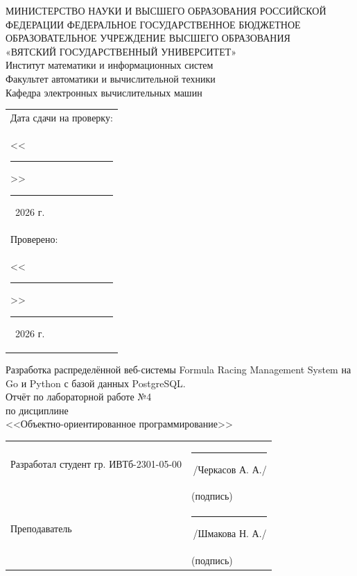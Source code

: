 \documentclass[oneside,a4paper,14pt]{extarticle}
\begin{document}
\newpage
\thispagestyle{empty}
\begin{center}
  МИНИСТЕРСТВО НАУКИ И ВЫСШЕГО ОБРАЗОВАНИЯ РОССИЙСКОЙ ФЕДЕРАЦИИ ФЕДЕРАЛЬНОЕ ГОСУДАРСТВЕННОЕ БЮДЖЕТНОЕ ОБРАЗОВАТЕЛЬНОЕ УЧРЕЖДЕНИЕ ВЫСШЕГО ОБРАЗОВАНИЯ\\
  «ВЯТСКИЙ ГОСУДАРСТВЕННЫЙ УНИВЕРСИТЕТ»\\
  Институт математики и информационных систем\\
  Факультет автоматики и вычислительной техники\\
  Кафедра электронных вычислительных машин
\end{center}
\vspace{10mm}

\hfill
\begin{tabular}{l}
  \footnotesize Дата сдачи на проверку:                                          \\
  \footnotesize <<\rule[-1mm]{5mm}{0.10mm}\/>>\ \rule[-1mm]{20mm}{0.10mm}\ 2026 г. \\
  \footnotesize Проверено:                                                       \\
  \footnotesize <<\rule[-1mm]{5mm}{0.10mm}\/>>\ \rule[-1mm]{20mm}{0.10mm}\ 2026 г. \\
\end{tabular}
\vfill

\begin{center}
  Разработка распределённой веб-системы Formula Racing Management System на Go и Python с базой данных PostgreSQL. \\
  Отчёт по лабораторной работе №4\\
  по дисциплине\\
  <<Объектно-ориентированное программирование>>\\
\end{center}
\vspace{25mm}
\noindent
\begin{tabular}{ll}
  Разработал студент гр. ИВТб-2301-05-00 & \hspace{18mm}\rule[-1mm]{30mm}{0.10mm}\,/Черкасов А. А./ \\
                                         & \hspace{25.5mm}\footnotesize(подпись)                    \\
  Преподаватель                  & \hspace{18mm}\rule[-1mm]{30mm}{0.10mm}\,/Шмакова Н. А./ \\
                                         & \hspace{25.5mm}\footnotesize(подпись)                    \\
\end{tabular}
\end{document}
